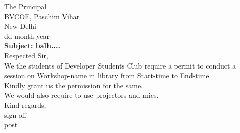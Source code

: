 \documentclass[12pt,a4paper]{article} %
\begin{document}
	

	\hspace{-8mm}
	The Principal \\
	BVCOE, Paschim Vihar\\
	New Delhi\\
	\linebreak
	dd month year\\
	\linebreak
	\textbf{Subject: balh....}\\
	\linebreak
	Respected Sir,\\
	
	\vspace{-5mm}
	\hspace{8mm}
	We the students of Developer Students Club require a permit to conduct a session on 
	Workshop-name 
	in library from 
	Start-time 
	to 
	End-time.\\
	Kindly grant us the permission for the same. \\
	We would also require to use projectors and mics.\\
	\linebreak
	Kind regards,\\
	sign-off\\
	post 
	
\end{document}
